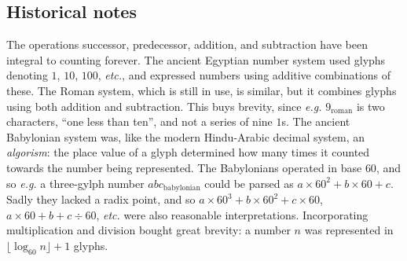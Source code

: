 \label{sec:related}

%


\subsection{Historical notes}

The operations successor, predecessor, addition, and subtraction have
been integral to counting forever. The ancient Egyptian
number system used glyphs denoting $1$, $10$, $100$, \emph{etc.},
and expressed numbers using additive combinations of these.
The Roman system, which is still in use, is similar, but
it combines glyphs using both addition and subtraction. This buys brevity,
since \emph{e.g.} $9_{\text{roman}}$ is two characters, ``one less than ten'',
and not a series of nine $1$s.
The ancient Babylonian system was, like the modern Hindu-Arabic decimal system,
an \emph{algorism}: the place value of a glyph determined how many times it 
counted towards the number being represented.
The Babylonians operated in
base $60$, and so \emph{e.g.} a three-gylph number $abc_{\text{babylonian}}$ could
be parsed as $a \times 60^2 + b \times 60 + c$. Sadly they lacked
a radix point, and so
$a \times 60^3 + b \times 60^2 + c \times 60$, $a \times 60 + b + c \div 60$, 
\emph{etc.} were also reasonable interpretations. 
Incorporating multiplication and division bought great brevity: a number $n$ was 
represented in $\lfloor \log_{60}n \rfloor + 1$ glyphs.


